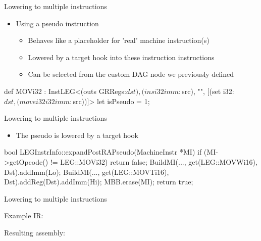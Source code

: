 \begin{frame}[fragile]{Lowering to multiple instructions}

\begin{itemize}
    \item Using a pseudo instruction
    \begin{itemize}
        \item Behaves like a placeholder for 'real' machine instruction(s)
        \item Lowered by a target hook into these instruction instructions
        \item Can be selected from the custom DAG node we previously defined
    \end{itemize}
\end{itemize}

\begin{codebox}
def MOVi32 : InstLEG<(outs GRRegs:$dst), (ins i32imm:$src), "",
                     [(set i32:$dst, (movei32 i32imm:$src))]> {
  let isPseudo = 1;
}
\end{codebox}

\end{frame}


\begin{frame}[fragile]{Lowering to multiple instructions}

\begin{itemize}
    \item The pseudo is lowered by a target hook
\end{itemize}


\begin{codebox}
bool LEGInstrInfo::expandPostRAPseudo(MachineInstr *MI) {
   if (MI->getOpcode() != LEG::MOVi32) return false;
   BuildMI(..., get(LEG::MOVWi16), Dst).addImm(Lo);
   BuildMI(..., get(LEG::MOVTi16), Dst).addReg(Dst).addImm(Hi);
   MBB.erase(MI);
   return true;
}
\end{codebox}

\end{frame}


\begin{frame}{Lowering to multiple instructions}

Example IR:

Resulting assembly:

\end{frame}

